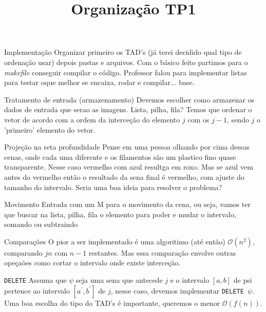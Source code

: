 \documentclass[12pt]{article}
\title{Organização TP1}
\begin{document}
 	
 	\maketitle
 	
 	\begin{section}{Implementação}
 		Organizar primeiro os TAD's (já terei decidido qual tipo de ordenação usar) depois pastas e arquivos. Com o básico feito partimos para o \textit{makefile} conseguir compilar o código. Professor falou para implementar listas para testar oque melhor se encaixa, rodar e compilar... base.
    	\end{section}
    
    \begin{section}{Tratamento de entrada (armazenamento)}
    	Devemos escolher como armazenar os dados de entrada que serao as imagens. Lista, pilha, fila? Temos que ordenar o vetor de acordo com a ordem da interceção do elemento $j$ com os $j-1$, sendo $j$ o 'primeiro' elemento do vetor.
    	\end{section}
    	
    \begin{section}{Projeção na reta profundidade}
    	Pense em uma pessoa olhando por cima dessas cenas, onde cada uma diferente e os filamentos são um plastico fino quase transparente. Nesse caso vermelho com azul resultga em roxo. Mas se azul vem antes do vermelho então o resultado da sena final é vermelho, com ajuste do tamanho do intervalo. Seria uma boa ideia para resolver o problema?
    	\end{section}
    
    \begin{section}{Movimento}
    	Entrada com um M para o movimento da cena, ou seja, vamos ter que buscar na lista, pilha, fila o elemento para poder e mudar o intervalo, somando ou subtraindo
    	\end{section}
    	
    	
    \begin{section}{Comparações}
    	O pior a ser implementado é uma algoritimo (até então) $\mathcal{O}(n^2)$, comparando $jn$ com $n-1$ restantes. Mas essa comparação envolve outras opeçaões como cortar o intervalo onde existe interceção.
    \end{section}
    	
    \begin{section}{\texttt{DELETE}}
    	Assuma que $\psi$ seja uma sena que antecede $j$ e o intervalo $[a,b]$ de psi pertence ao intervalo $[a^{'},b^{'}]$ de $j$, nesse caso, devemos implementar \texttt{DELETE $\psi$}. Uma boa escolha do tipo do TAD's é importante, queremos o menor  $\mathcal{O}(f(n))$. 
    	\end{section}
    	
    	
 
 	
 
\end{document}
